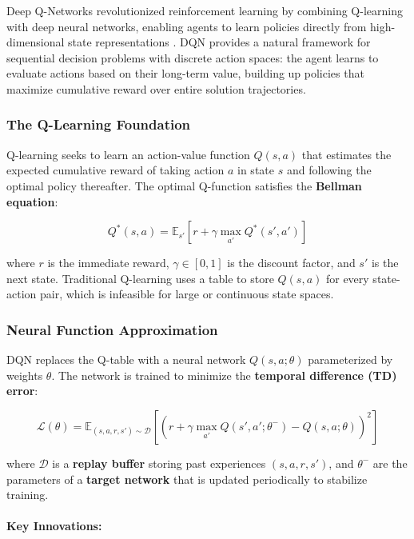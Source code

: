 Deep Q-Networks revolutionized reinforcement learning by combining Q-learning with deep neural networks, enabling agents to learn policies directly from high-dimensional state representations \cite{MKS+15}. DQN provides a natural framework for sequential decision problems with discrete action spaces: the agent learns to evaluate actions based on their long-term value, building up policies that maximize cumulative reward over entire solution trajectories.

\subsubsection{The Q-Learning Foundation}

Q-learning seeks to learn an action-value function $Q(s, a)$ that estimates the expected cumulative reward of taking action $a$ in state $s$ and following the optimal policy thereafter. The optimal Q-function satisfies the \textbf{Bellman equation}:

\begin{equation}
Q^*(s, a) = \mathbb{E}_{s'}\left[r + \gamma \max_{a'} Q^*(s', a')\right]
\end{equation}

where $r$ is the immediate reward, $\gamma \in [0, 1]$ is the discount factor, and $s'$ is the next state. Traditional Q-learning uses a table to store $Q(s, a)$ for every state-action pair, which is infeasible for large or continuous state spaces.

\subsubsection{Neural Function Approximation}

DQN replaces the Q-table with a neural network $Q(s, a; \theta)$ parameterized by weights $\theta$. The network is trained to minimize the \textbf{temporal difference (TD) error}:

\begin{equation}
\mathcal{L}(\theta) = \mathbb{E}_{(s, a, r, s') \sim \mathcal{D}}\left[\left(r + \gamma \max_{a'} Q(s', a'; \theta^-) - Q(s, a; \theta)\right)^2\right]
\end{equation}

where $\mathcal{D}$ is a \textbf{replay buffer} storing past experiences $(s, a, r, s')$, and $\theta^-$ are the parameters of a \textbf{target network} that is updated periodically to stabilize training.

\paragraph{Key Innovations:}

